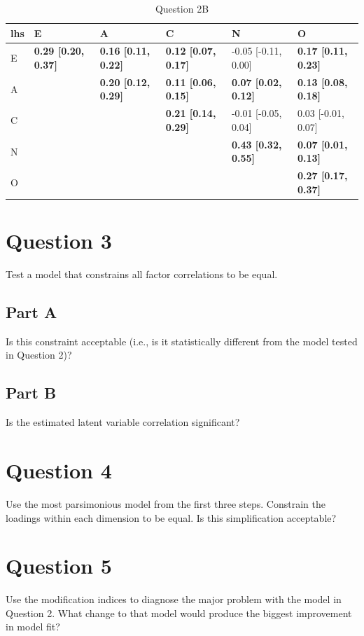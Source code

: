 \documentclass{article}\usepackage[]{graphicx}\usepackage[]{color}
\newenvironment{knitrout}{}{} %
\begin{document}
\begin{knitrout}
\begin{table}
\caption{\label{tab:unnamed-chunk-7}Question 2B}
\centering
\begin{tabular}[t]{llllll}
\toprule
lhs & E & A & C & N & O\\
\midrule
E & \textbf{0.29 [0.20, 0.37]} & \textbf{0.16 [0.11, 0.22]} & \textbf{0.12 [0.07, 0.17]} & -0.05 [-0.11, 0.00] & \textbf{0.17 [0.11, 0.23]}\\
A &  & \textbf{0.20 [0.12, 0.29]} & \textbf{0.11 [0.06, 0.15]} & \textbf{0.07 [0.02, 0.12]} & \textbf{0.13 [0.08, 0.18]}\\
C &  &  & \textbf{0.21 [0.14, 0.29]} & -0.01 [-0.05, 0.04] & 0.03 [-0.01, 0.07]\\
N &  &  &  & \textbf{0.43 [0.32, 0.55]} & \textbf{0.07 [0.01, 0.13]}\\
O &  &  &  &  & \textbf{0.27 [0.17, 0.37]}\\
\bottomrule
\end{tabular}
\end{table}


\end{knitrout}

\section{Question 3}
Test a model that constrains all factor correlations to be equal.  

\subsection{Part A}
Is this constraint acceptable (i.e., is it statistically different from the model tested in Question 2)?


\subsection{Part B}
Is the estimated latent variable correlation significant?



\section{Question 4}
Use the most parsimonious model from the first three steps. Constrain the loadings within each dimension to be equal. Is this simplification acceptable?



\section{Question 5}
Use the modification indices to diagnose the major problem with the model in Question 2. What change to that model would produce the biggest improvement in model fit?
\end{document}
